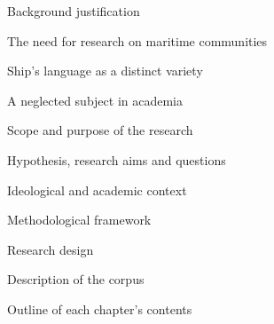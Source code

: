 \setcounter{listWWNumiiileveli}{0}
\begin{listWWNumiiileveli}
\item 

\setcounter{listWWNumiiilevelii}{0}
\begin{listWWNumiiilevelii}
\item 
\begin{styleNormali}
Background justification 
\end{styleNormali}


\setcounter{listWWNumiiileveliii}{0}
\begin{listWWNumiiileveliii}
\item 
\begin{styleNormali}
The need for research on maritime communities
\end{styleNormali}
\item 
\begin{styleNormali}
Ship’s language as a distinct variety
\end{styleNormali}
\item 
\begin{styleNormali}
A neglected subject in academia 
\end{styleNormali}
\end{listWWNumiiileveliii}
\item 
\begin{styleNormali}
Scope and purpose of the research \ 
\end{styleNormali}


\setcounter{listWWNumiiileveliii}{0}
\begin{listWWNumiiileveliii}
\item 
\begin{styleNormali}
Hypothesis, research aims and questions 
\end{styleNormali}
\item 
\begin{styleNormali}
Ideological and academic context
\end{styleNormali}
\end{listWWNumiiileveliii}
\item 
\begin{styleNormali}
Methodological framework 
\end{styleNormali}


\setcounter{listWWNumiiileveliii}{0}
\begin{listWWNumiiileveliii}
\item 
\begin{styleNormali}
Research design
\end{styleNormali}
\item 
\begin{styleNormali}
Description of the corpus
\end{styleNormali}
\item 
\begin{styleNormali}
Outline of each chapter’s contents
\end{styleNormali}
\end{listWWNumiiileveliii}
\end{listWWNumiiilevelii}
\end{listWWNumiiileveli}

